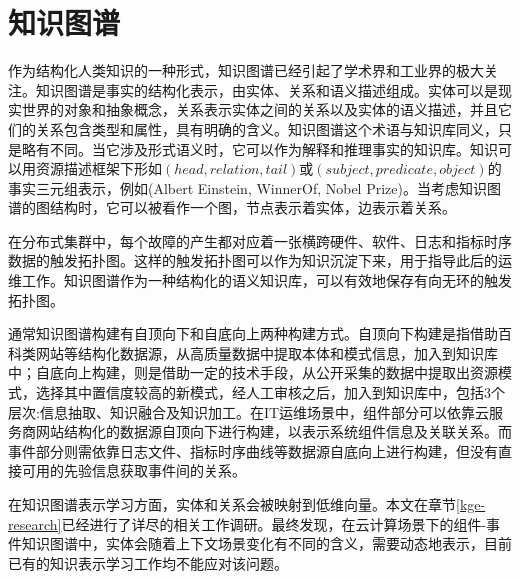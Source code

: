 \section{知识图谱}
作为结构化人类知识的一种形式，知识图谱已经引起了学术界和工业界的极大关注\cite{ji2021survey}。知识图谱是事实的结构化表示，由实体、关系和语义描述组成。实体可以是现实世界的对象和抽象概念，关系表示实体之间的关系以及实体的语义描述，并且它们的关系包含类型和属性，具有明确的含义。知识图谱这个术语与知识库同义，只是略有不同。当它涉及形式语义时，它可以作为解释和推理事实的知识库。知识可以用资源描述框架下形如$(head,relation,tail)$或$(subject,predicate,object)$的事实三元组表示，例如(Albert Einstein, WinnerOf, Nobel Prize)。当考虑知识图谱的图结构时，它可以被看作一个图，节点表示着实体，边表示着关系。

在分布式集群中，每个故障的产生都对应着一张横跨硬件、软件、日志和指标时序数据的触发拓扑图。这样的触发拓扑图可以作为知识沉淀下来，用于指导此后的运维工作。知识图谱作为一种结构化的语义知识库，可以有效地保存有向无环的触发拓扑图。

通常知识图谱构建有自顶向下和自底向上两种构建方式\cite{liqiao2016kgconstrut-review}。自顶向下构建是指借助百科类网站等结构化数据源，从高质量数据中提取本体和模式信息，加入到知识库中；自底向上构建，则是借助一定的技术手段，从公开采集的数据中提取出资源模式，选择其中置信度较高的新模式，经人工审核之后，加入到知识库中，包括3个层次:信息抽取、知识融合及知识加工。在IT运维场景中，组件部分可以依靠云服务商网站结构化的数据源自顶向下进行构建，以表示系统组件信息及关联关系。而事件部分则需依靠日志文件、指标时序曲线等数据源自底向上进行构建，但没有直接可用的先验信息获取事件间的关系。

在知识图谱表示学习方面，实体和关系会被映射到低维向量\cite{wang2017knowledge,lin2018knowledge}。本文在章节\ref{kge-research}已经进行了详尽的相关工作调研。最终发现，在云计算场景下的组件-事件知识图谱中，实体会随着上下文场景变化有不同的含义，需要动态地表示，目前已有的知识表示学习工作均不能应对该问题。

